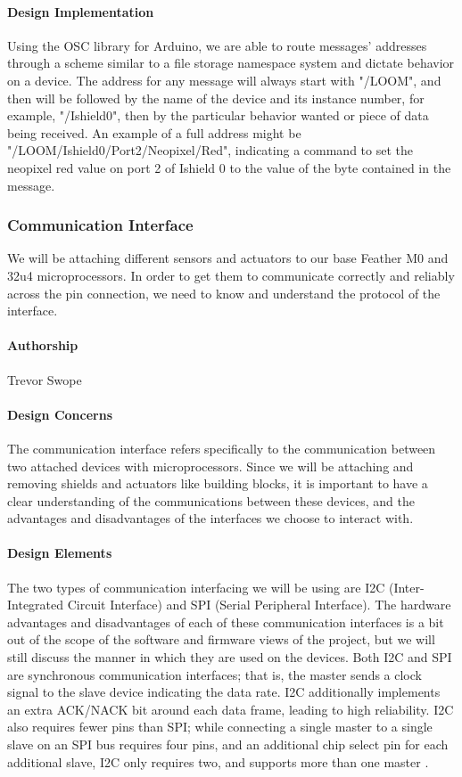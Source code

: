 \documentclass[onecolumn, draftclsnofoot,10pt, compsoc]{IEEEtran}
\begin{document}
\paragraph{Design Implementation}
    Using the OSC library for Arduino, we are able to route messages' addresses through a scheme similar to a file storage namespace system and dictate behavior on a device. The address for any message will always start with "/LOOM", and then will be followed by the name of the device and its instance number, for example, "/Ishield0", then by the particular behavior wanted or piece of data being received. An example of a full address might be "/LOOM/Ishield0/Port2/Neopixel/Red", indicating a command to set the neopixel red value on port 2 of Ishield 0 to the value of the byte contained in the message. 


\subsubsection{Communication Interface}
    We will be attaching different sensors and actuators to our base Feather M0 and 32u4 microprocessors. In order to get them to communicate correctly and reliably across the pin connection, we need to know and understand the protocol of the interface. 

\paragraph{Authorship}
    Trevor Swope

\paragraph{Design Concerns}
    The communication interface refers specifically to the communication between two attached devices with microprocessors. Since we will be attaching and removing shields and actuators like building blocks, it is important to have a clear understanding of the communications between these devices, and the advantages and disadvantages of the interfaces we choose to interact with.

\paragraph{Design Elements}
    The two types of communication interfacing we will be using are I2C (Inter-Integrated Circuit Interface) and SPI (Serial Peripheral Interface). The hardware advantages and disadvantages of each of these communication interfaces is a bit out of the scope of the software and firmware views of the project, but we will still discuss the manner in which they are used on the devices. Both I2C and SPI are synchronous communication interfaces; that is, the master sends a clock signal to the slave device indicating the data rate. I2C additionally implements an extra ACK/NACK bit around each data frame, leading to high reliability. I2C also requires fewer pins than SPI; while connecting a single master to a single slave on an SPI bus requires four pins, and an additional chip select pin for each additional slave, I2C only requires two, and supports more than one master \cite{I2C} \cite{SPI}.
\end{document}
